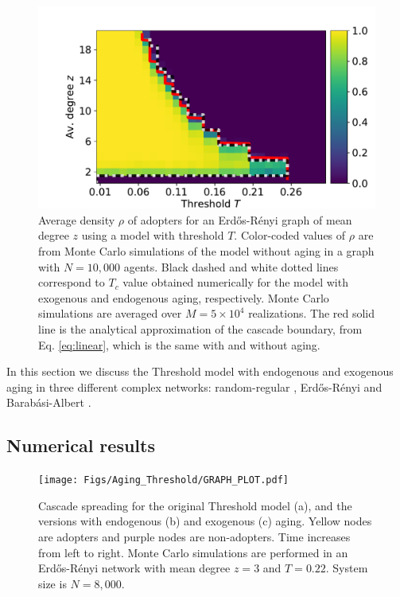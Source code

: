 \begin{figure}[]
\includegraphics[width=1\columnwidth]{Figs/Aging_Threshold/cascade.pdf}
\caption{\label{fig:umbral} Average density $\rho$ of adopters for an Erd\H{o}s-R\'enyi graph of mean degree $z$ using a model with threshold $T$. Color-coded values of $\rho$ are from Monte Carlo simulations of the model without aging in a graph with $N = 10,000$ agents.  Black dashed and white dotted lines correspond to $T_c$ value obtained numerically for the model with exogenous and endogenous aging, respectively.  Monte Carlo simulations are averaged over $M = 5 \times 10^4$ realizations. The red solid line is the analytical approximation of the cascade boundary, from Eq. \eqref{eq:linear}, which is the same with and without aging.}
\end{figure}

In this section we discuss the Threshold model with endogenous and exogenous aging in three different complex networks: random-regular \cite{wormald1999models}, Erd\H{o}s-R\'enyi \cite{erdos1960evolution} and Barab\'asi-Albert \cite{barabasi2009scale}.

\subsection{\label{subsec:Numerical results} Numerical results}

\begin{figure}
\texttt{[image: Figs/Aging\_Threshold/GRAPH\_PLOT.pdf]}
\caption{\label{fig:graph_plot} Cascade spreading for the original Threshold model (a), and the versions with endogenous (b) and exogenous (c) aging. Yellow nodes are adopters and purple nodes are non-adopters. Time increases from left to right. Monte Carlo simulations are performed in an Erd\H{o}s-R\'enyi network with mean degree $z = 3$ and $T = 0.22$. System size is $N = 8,000$.}
\end{figure}

